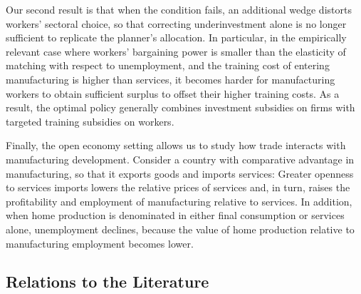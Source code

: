 \documentclass[12pt]{article} %
\theoremstyle{definition}
\begin{document}
Our second result is that when  the \cite{Hosios1990} condition fails, an additional wedge distorts workers' sectoral choice, so that correcting underinvestment alone is no longer sufficient to replicate the planner's allocation.  In particular, in the empirically relevant case where workers' bargaining power is smaller than the elasticity of matching with respect to unemployment, and the training cost of entering manufacturing is higher than services, it becomes harder for manufacturing workers to obtain sufficient surplus to offset their higher training costs.  As a result, the optimal policy generally combines investment subsidies on firms with targeted training subsidies on workers. 


Finally, the open economy setting allows us to study how trade interacts with manufacturing development.
Consider a country with comparative advantage in manufacturing, so that it exports goods and imports services:  Greater openness to services imports lowers the relative prices of services and, in turn, raises
the profitability and employment of manufacturing relative to services. In addition, when home production is denominated in either final consumption or services alone, unemployment declines, because the value of home production relative to manufacturing employment becomes lower. 




\subsection{Relations to the Literature}\label{lit review}
\end{document}
